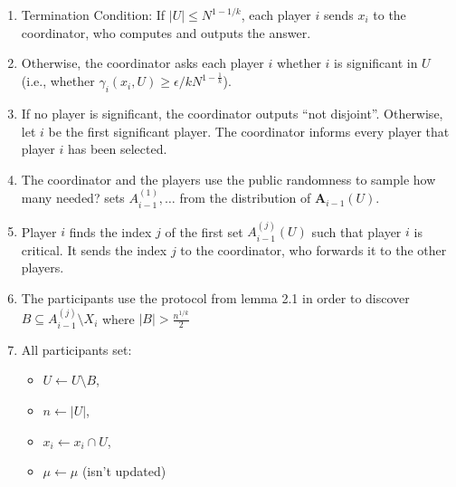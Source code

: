 \documentclass{article}
\newcommand{\eps}{\epsilon}
\newcommand{\TODO}[1]{ {\color{red} #1 }}
\newcommand{\rv}[1]{\mathbf{#1}}
\theoremstyle{plain}
\begin{document}
\begin{enumerate}[(1)]
  \item Termination Condition: If $|U| \leq N^{1 - 1/k}$, each player $i$ sends $x_i$ to the coordinator, who computes and outputs the answer. 
  \item Otherwise, the coordinator asks each player $i$ whether $i$ is significant in $U$ (i.e., whether $\gamma_i(x_i, U) \geq \eps / kN^{1-\frac{1}{k}}$).
  \item If no player is significant, the coordinator outputs ``not disjoint''. Otherwise, let $i$ be the
    first significant player. The coordinator informs every player that player $i$ has been selected.
  \item The coordinator and the players use the public randomness to sample \TODO{how many needed?}
    sets $A_{i-1}^{(1)},\ldots$ from the distribution of $\rv{A}_{i-1}(U)$.
  \item Player $i$ finds the index $j$ of the first set $A_{i-1}^{(j)}(U)$ such that player $i$ is critical.
    It sends the index $j$ to the coordinator, who forwards it to the other players.
  \item The participants use the protocol from lemma 2.1 in order to discover $B \subseteq A_{i-1}^{(j)} \setminus X_i $ where $ |B| > \frac{n^{1/k}}{2}$ 
  \item All participants set:
    \begin{itemize}
      \item $U \leftarrow U \setminus B$,
      \item $n \leftarrow |U|$,
      \item $x_i \leftarrow x_i \cap U$,
      \item $\mu \leftarrow \mu $ (isn't updated)
    \end{itemize}
\end{enumerate}

\end{document}
